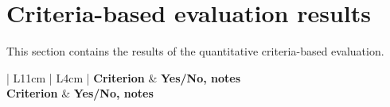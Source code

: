 \chapter{Criteria-based evaluation results}\label{app:criteria-evaluation}

This section contains the results of the quantitative criteria-based evaluation.\\

\begin{center}
\begin{longtable}{ | L{11cm} | L{4cm} | }
  \hline
  \textbf{Criterion} & \textbf{Yes/No, notes} \\
  \hline
\endfirsthead
  \hline
  \textbf{Criterion} & \textbf{Yes/No, notes} \\
  \hline
\endhead
\endfoot
\endlastfoot


\end{longtable}
\end{center}
